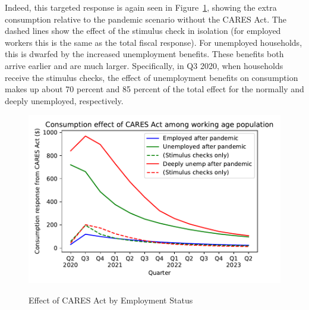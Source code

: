 \documentclass[titlepage,a4paper]{\econtex}
\begin{document}
Indeed, this targeted response is again seen in Figure~\ref{stim_by_emp},
showing the extra consumption relative to the pandemic scenario without the CARES Act.
The dashed lines show the effect of the stimulus check in isolation (for employed workers this is the same as the total fiscal response).
For unemployed households, this is dwarfed by the increased unemployment benefits.
These benefits both arrive earlier and are much larger.
Specifically, in Q3 2020, when households receive the stimulus checks, the effect of unemployment benefits on consumption makes up about 70 percent and 85 percent of the total effect for the normally and deeply unemployed, respectively.

\begin{figure}
  \centering
  \caption{Effect of CARES Act by Employment Status}
  \label{stim_by_emp}
  { \includegraphics[width=8in]{./Figures/ConDeltaByEmpState}}
\end{figure}
\end{document}
